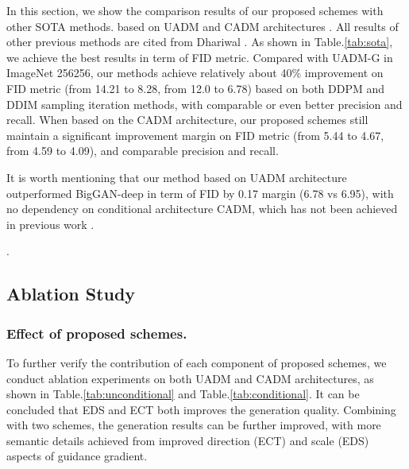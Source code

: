 \documentclass[runningheads]{llncs}
\begin{document}
%
 In this section, we show the comparison results of our proposed schemes with other SOTA methods.
based on UADM and CADM  architectures \cite{dhariwal2021diffusion}.
All results of other previous methods are cited from Dhariwal \etal \cite{dhariwal2021diffusion}.
As shown in Table.\ref{tab:sota}, we achieve the best results in term of FID metric.
Compared with UADM-G in ImageNet 256256, our methods achieve relatively about 40\% improvement on FID metric (from 14.21 to 8.28, from 12.0 to 6.78) based on both DDPM and DDIM sampling iteration methods, with comparable or even better precision and recall.
When based on the CADM architecture, our proposed schemes still maintain a significant improvement margin on FID metric (from 5.44 to 4.67, from 4.59 to 4.09), and comparable precision and recall.

It is worth mentioning that our method based on UADM architecture outperformed BigGAN-deep in term of FID by 0.17 margin (6.78 vs 6.95), with no dependency on conditional architecture CADM, which has not been achieved in previous work \cite{dhariwal2021diffusion,ho2020denoising,nichol2021improved}.
\vspace{-6pt}


.








\subsection{Ablation Study}
\subsubsection{Effect of proposed schemes.}
\label{exp:overall_ab}
To further verify the contribution of each component of proposed schemes, we conduct ablation experiments on both UADM and CADM architectures, as shown in Table.\ref{tab:unconditional} and Table.\ref{tab:conditional}.
It can be concluded that EDS and ECT both improves the generation quality.
Combining with two schemes, the generation results can be further improved, with more semantic details achieved from improved direction (ECT) and scale (EDS) aspects of guidance gradient.
\end{document}
